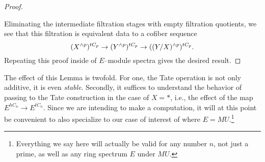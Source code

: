\begin{proof}
\begin{center}
\end{center}
Eliminating the intermediate filtration stages with empty filtration quotients, we see that this filtration is equivalent data to a cofiber sequence \[(X^{\wedge p})^{tC_p} \to (Y^{\wedge p})^{tC_p} \to ((Y/X)^{\wedge p})^{tC_p}.\]  Repeating this proof inside of $E$--module spectra gives the desired result.
\end{proof}

The effect of this Lemma is twofold.  For one, the Tate operation is not only additive, it is even \emph{stable}.  Secondly, it suffices to understand the behavior of passing to the Tate construction in the case of $X = *$, i.e., the effect of the map $E^{hC_n} \to E^{tC_n}$.  Since we are intending to make a computation, it will at this point be convenient to also specialize to our case of interest of where $E = MU$.\footnote{Everything we say here will actually be valid for any number $n$, not just a prime, as well as any ring spectrum $E$ under $MU$.}

